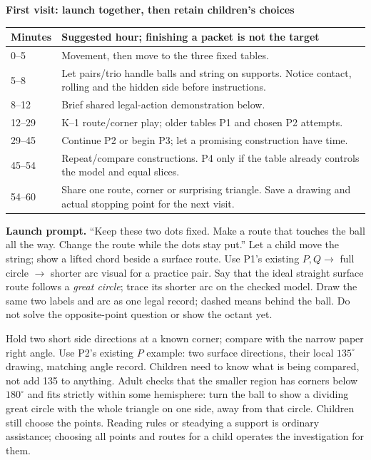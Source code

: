 \documentclass[11pt,letterpaper]{article}
\newcommand{\topic}[1]{\par{\large\bfseries\color{blue}#1}\par}
\newcommand{\degc}{^\circ}
\begin{document}
\newpage
\topic{First visit: launch together, then retain children's choices}
\begin{tabular}{@{}p{.65in}p{6.12in}@{}}
\toprule
Minutes & Suggested hour; finishing a packet is not the target\\\midrule
0--5 & Movement, then move to the three fixed tables.\\
5--8 & Let pairs/trio handle balls and string on supports. Notice contact, rolling and the hidden side before instructions.\\
8--12 & Brief shared legal-action demonstration below.\\
12--29 & K--1 route/corner play; older tables P1 and chosen P2 attempts.\\
29--45 & Continue P2 or begin P3; let a promising construction have time.\\
45--54 & Repeat/compare constructions. P4 only if the table already controls the model and equal slices.\\
54--60 & Share one route, corner or surprising triangle. Save a drawing and actual stopping point for the next visit.\\\bottomrule
\end{tabular}

\textbf{Launch prompt.} ``Keep these two dots fixed. Make a route that touches the ball all the way. Change the route while the dots stay put.'' Let a child move the string; show a lifted chord beside a surface route. Use P1's existing $P,Q\to$ full circle $\to$ shorter arc visual for a practice pair. Say that the ideal straight surface route follows a \emph{great circle}; trace its shorter arc on the checked model. Draw the same two labels and arc as one legal record; dashed means behind the ball. Do not solve the opposite-point question or show the octant yet.

Hold two short side directions at a known corner; compare with the narrow paper right angle. Use P2's existing $P$ example: two surface directions, their local $135\degc$ drawing, matching angle record. Children need to know what is being compared, not add 135 to anything. Adult checks that the smaller region has corners below $180^\circ$ and fits strictly within some hemisphere: turn the ball to show a dividing great circle with the whole triangle on one side, away from that circle. Children still choose the points. Reading rules or steadying a support is ordinary assistance; choosing all points and routes for a child operates the investigation for them.
\end{document}
